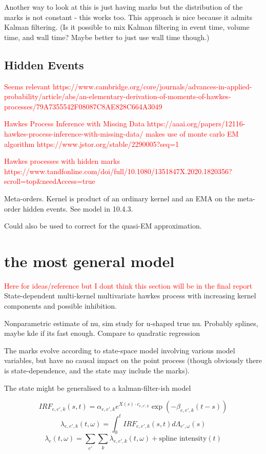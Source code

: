 \documentclass[honours,12pt]{unswthesis}
\numberwithin{equation}{section}
\begin{document}
Another way to look at this is just having marks but the distribution of the marks is not constant - this works too. This approach is nice because it admits Kalman filtering. (Is it possible to mix Kalman filtering in event time, volume time, and wall time? Maybe better to just use wall time though.)

\subsection{Hidden Events}
\textcolor{red}{Seems relevant https://www.cambridge.org/core/journals/advances-in-applied-probability/article/abs/an-elementary-derivation-of-moments-of-hawkes-processes/79A7355542F08087C8AE828C664A3049}

\textcolor{red}{Hawkes Process Inference with Missing Data https://aaai.org/papers/12116-hawkes-process-inference-with-missing-data/ makes use of monte carlo EM algorithm https://www.jstor.org/stable/2290005?seq=1}

\textcolor{red}{Hawkes processes with hidden marks https://www.tandfonline.com/doi/full/10.1080/1351847X.2020.1820356?scroll=top&needAccess=true}

Meta-orders. Kernel is product of an ordinary kernel and an EMA on the meta-order hidden events. See model in \cite{BouchaudEtAl} 10.4.3.

Could also be used to correct for the quasi-EM approximation.

\section{the most general model}
\textcolor{red}{Here for ideas/reference but I dont think this section will be in the final report}
State-dependent multi-kernel multivariate hawkes process with increasing kernel components and possible inhibition.

Nonparametric estimate of nu, sim study for u-shaped true nu. Probably splines, maybe kde if its fast enough. Compare to quadratic regression

The marks evolve according to state-space model involving various model variables, but have no causal impact on the point process (though obviously there is state-dependence, and the state may include the marks).

The state might be generalised to a kalman-filter-ish model \cite{SmithBrown}

$$IRF_{e,e',k}(s,t) = \alpha_{e,e',k} e^{X(s)\cdot c_{e,e',k}}\exp\left(-\beta_{e,e',k}(t-s)\right)$$
$$\lambda_{e,e',k}(t,\omega) = \int_0^t IRF_{e,e',k}(s,t) d\Lambda_{e',\omega}(s)$$
$$\lambda_e(t,\omega) = \sum_{e'} \sum_k \lambda_{e,e',k}(t,\omega) + \text{spline intensity}(t)$$
\end{document}
